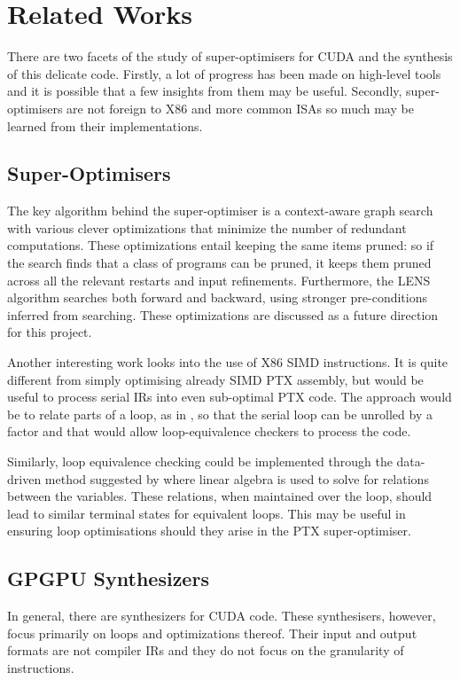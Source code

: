 \documentclass[letterpaper,twocolumn,10pt]{article}
\begin{document}
\section{Related Works}

There are two facets of the study of super-optimisers for
CUDA and the synthesis of this delicate code. Firstly, a lot
of progress has been made on high-level tools and it is possible
that a few insights from them may be useful. Secondly, super-optimisers
are not foreign to X86 and more common ISAs so much may be learned from
their implementations.

\subsection{Super-Optimisers}

The key algorithm behind the super-optimiser \cite{superopt}
is a context-aware graph search with various clever
optimizations that minimize the number of redundant computations.
These optimizations entail keeping the same items pruned:
so if the search finds that a class of programs
can be pruned, it keeps them pruned across all
the relevant restarts and input refinements.
Furthermore, the LENS algorithm searches both forward and backward,
using stronger pre-conditions inferred from searching. These
optimizations are discussed as a future direction for this project.

Another interesting work looks into the use of X86
SIMD instructions. It is quite different from simply
optimising already SIMD PTX assembly, but would be
useful to process serial IRs into even sub-optimal PTX code.
The approach would be to relate parts of a loop,
as in \cite{SIMDSynth}, so that the serial loop can be
unrolled by a factor and that would allow loop-equivalence
checkers to process the code.

Similarly, loop equivalence checking could be implemented
through the data-driven method suggested by \cite{DataEquiv}
where linear algebra is used to solve for relations between
the variables. These relations, when maintained over the loop,
should lead to similar terminal states for equivalent loops.
This may be useful in ensuring loop optimisations should
they arise in the PTX super-optimiser.

\subsection{GPGPU Synthesizers}

In general, there are synthesizers for CUDA code.
These synthesisers, however, focus primarily on loops
and optimizations thereof. Their input and output formats
are not compiler IRs and they do not focus on the
granularity of instructions.
\end{document}
